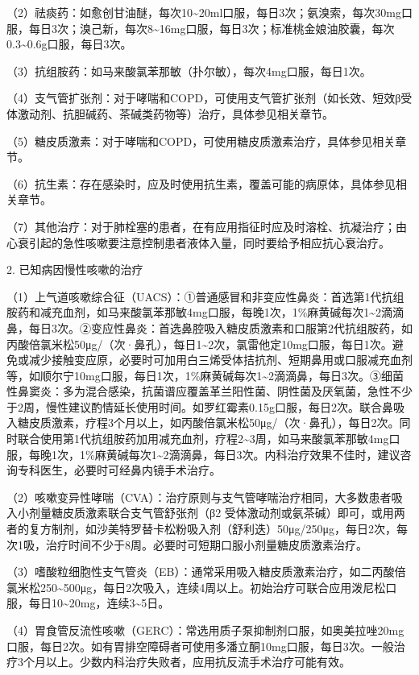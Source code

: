 （2）祛痰药：如愈创甘油醚，每次10\textasciitilde{}20ml口服，每日3次；氨溴索，每次30mg口服，每日3次；溴己新，每次8\textasciitilde{}16mg口服，每日3次；标准桃金娘油胶囊，每次0.3\textasciitilde{}0.6g口服，每日3次。

（3）抗组胺药：如马来酸氯苯那敏（扑尔敏），每次4mg口服，每日1次。

（4）支气管扩张剂：对于哮喘和COPD，可使用支气管扩张剂（如长效、短效β受体激动剂、抗胆碱药、茶碱类药物等）治疗，具体参见相关章节。

（5）糖皮质激素：对于哮喘和COPD，可使用糖皮质激素治疗，具体参见相关章节。

（6）抗生素：存在感染时，应及时使用抗生素，覆盖可能的病原体，具体参见相关章节。

（7）其他治疗：对于肺栓塞的患者，在有应用指征时应及时溶栓、抗凝治疗；由心衰引起的急性咳嗽要注意控制患者液体入量，同时要给予相应抗心衰治疗。

2. 已知病因慢性咳嗽的治疗

（1）上气道咳嗽综合征（UACS）：①普通感冒和非变应性鼻炎：首选第1代抗组胺药和减充血剂，如马来酸氯苯那敏4mg口服，每晚1次，1\%麻黄碱每次1\textasciitilde{}2滴滴鼻，每日3次。②变应性鼻炎：首选鼻腔吸入糖皮质激素和口服第2代抗组胺药，如丙酸倍氯米松50μg/（次·鼻孔），每日1\textasciitilde{}2次，氯雷他定10mg口服，每日1次。避免或减少接触变应原，必要时可加用白三烯受体拮抗剂、短期鼻用或口服减充血剂等，如顺尔宁10mg口服，每日1次，1\%麻黄碱每次1\textasciitilde{}2滴滴鼻，每日3次。③细菌性鼻窦炎：多为混合感染，抗菌谱应覆盖革兰阳性菌、阴性菌及厌氧菌，急性不少于2周，慢性建议酌情延长使用时间。如罗红霉素0.15g口服，每日2次。联合鼻吸入糖皮质激素，疗程3个月以上，如丙酸倍氯米松50μg/（次·鼻孔），每日2次。同时联合使用第1代抗组胺药加用减充血剂，疗程2\textasciitilde{}3周，如马来酸氯苯那敏4mg口服，每晚1次，1\%麻黄碱每次1\textasciitilde{}2滴滴鼻，每日3次。内科治疗效果不佳时，建议咨询专科医生，必要时可经鼻内镜手术治疗。

（2）咳嗽变异性哮喘（CVA）：治疗原则与支气管哮喘治疗相同，大多数患者吸入小剂量糖皮质激素联合支气管舒张剂（β{2}
受体激动剂或氨茶碱）即可，或用两者的复方制剂，如沙美特罗替卡松粉吸入剂（舒利迭）50μg/250μg，每日2次，每次1吸，治疗时间不少于8周。必要时可短期口服小剂量糖皮质激素治疗。

（3）嗜酸粒细胞性支气管炎（EB）：通常采用吸入糖皮质激素治疗，如二丙酸倍氯米松250\textasciitilde{}500μg，每日2次吸入，连续4周以上。初始治疗可联合应用泼尼松口服，每日10\textasciitilde{}20mg，连续3\textasciitilde{}5日。

（4）胃食管反流性咳嗽（GERC）：常选用质子泵抑制剂口服，如奥美拉唑20mg口服，每日2次。如有胃排空障碍者可使用多潘立酮10mg口服，每日3次。一般治疗3个月以上。少数内科治疗失败者，应用抗反流手术治疗可能有效。

